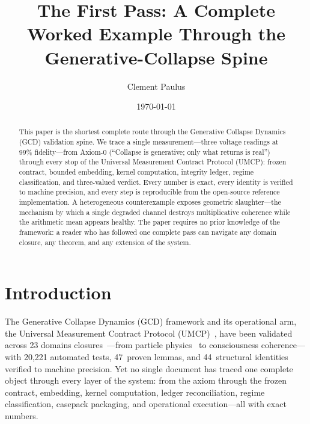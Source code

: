 \documentclass[
  aps,
  prd,
  twocolumn,
  superscriptaddress,
  nofootinbib,
  floatfix
]{revtex4-2}
\begin{document}
\title{The First Pass: A Complete Worked Example Through the
Generative-Collapse Spine}

\author{Clement Paulus}

\date{\today}

\begin{abstract}
This paper is the shortest complete route through the
Generative Collapse Dynamics (GCD) validation spine.  We trace a
single measurement---three voltage readings at 99\% fidelity---from
Axiom-0 (``Collapse is generative; only what returns is real'')
through every stop of the Universal Measurement Contract Protocol
(UMCP): frozen contract, bounded embedding, kernel computation,
integrity ledger, regime classification, and three-valued verdict.
Every number is exact, every identity is verified to machine
precision, and every step is reproducible from the open-source
reference implementation.  A heterogeneous counterexample exposes
geometric slaughter---the mechanism by which a single degraded
channel destroys multiplicative coherence while the arithmetic mean
appears healthy.  The paper requires no prior knowledge of the
framework: a reader who has followed one complete pass can navigate
any domain closure, any theorem, and any extension of the system.
\end{abstract}

\maketitle

\section{Introduction}\label{sec:intro}

The Generative Collapse Dynamics (GCD) framework and its operational
arm, the Universal Measurement Contract Protocol
(UMCP)~\cite{paulus2025umcp,paulus2025physicscoherence}, have been
validated across 23 domains
closures~\cite{umcpmetadatarepo}---from particle
physics~\cite{paulus2025physicscoherence} to consciousness
coherence---with 20{,}221 automated tests, 47~proven lemmas, and
44~structural identities verified to machine precision.  Yet no
single document has traced one complete object through every layer
of the system: from the axiom through the frozen contract, embedding,
kernel computation, ledger reconciliation, regime classification,
casepack packaging, and operational execution---all with exact numbers.
\end{document}
